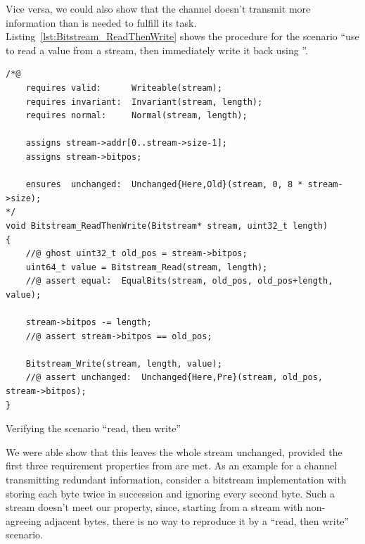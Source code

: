 Vice versa, we could also show that the channel doesn't transmit more
information than is needed to fulfill its task.
%
Listing~\ref{lst:Bitstream_ReadThenWrite}
shows the procedure for the scenario ``use 
to read a value from a stream, then immediately write it back using
''.




\begin{listing}[hbt]
\begin{minipage}{0.99\textwidth}
\begin{lstlisting}[style=acsl-block]
/*@
    requires valid:      Writeable(stream);
    requires invariant:  Invariant(stream, length);
    requires normal:     Normal(stream, length);

    assigns stream->addr[0..stream->size-1];
    assigns stream->bitpos;

    ensures  unchanged:  Unchanged{Here,Old}(stream, 0, 8 * stream->size);
*/
void Bitstream_ReadThenWrite(Bitstream* stream, uint32_t length)
{
    //@ ghost uint32_t old_pos = stream->bitpos;
    uint64_t value = Bitstream_Read(stream, length);
    //@ assert equal:  EqualBits(stream, old_pos, old_pos+length, value);

    stream->bitpos -= length;
    //@ assert stream->bitpos == old_pos;

    Bitstream_Write(stream, length, value);
    //@ assert unchanged:  Unchanged{Here,Pre}(stream, old_pos, stream->bitpos);
}
\end{lstlisting}
\end{minipage}
\caption{\label{lst:Bitstream_ReadThenWrite}
	Verifying the scenario ``read, then write'' }
\end{listing}


\FloatBarrier


We were able show that this leaves the
whole stream unchanged, provided the first three requirement properties
from  are met.
%
As an example for a channel transmitting redundant information,
consider
a bitstream implementation
with 
storing each byte twice in succession and 
ignoring every second byte.
%
Such a stream doesn't meet our property, since, 
starting from a stream with non-agreeing adjacent bytes, there is no
way to reproduce it by a ``read, then write'' scenario.

